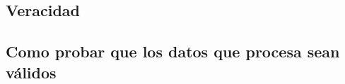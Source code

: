 \clearpage
\subsection{Veracidad}

\subsection{Como probar que los datos que procesa sean válidos}
\lipsum[1] %

\clearpage
